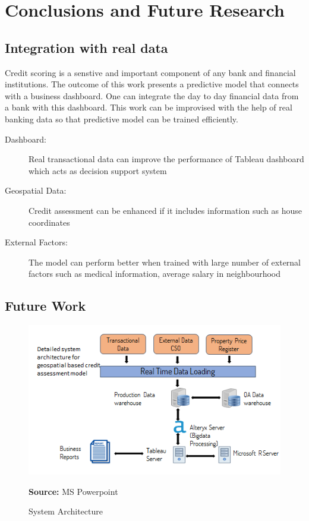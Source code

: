 %
%
%
%

\chapter{Conclusions and Future Research}\label{C.Conclusions.Future.research}

\section{Integration with real data}

Credit scoring is a senstive and important component of any bank and financial institutions. The outcome of this work presents a predictive model that connects with a business dashboard. One can integrate the day to day financial data from a bank with this dashboard. This work can be improvised with the help of real banking data so that predictive model can be trained efficiently.
\begin{description}
\item[Dashboard:] Real transactional data can improve the performance of Tableau dashboard which acts as decision support system 
\item[Geospatial Data:] Credit assessment can be enhanced if it includes information such as house coordinates
\item[External Factors:] The model can perform better when trained with large number of external factors such as medical information, average salary in neighbourhood

\end{description}

\section{Future Work}
\begin{center}
\begin{figure}[!htb]
\includegraphics[width=\textwidth]{future.png}
\centering
\caption{System Architecture}{\textbf{Source:} MS Powerpoint}
\label{fig:future}
\end{figure}
\end{center}
